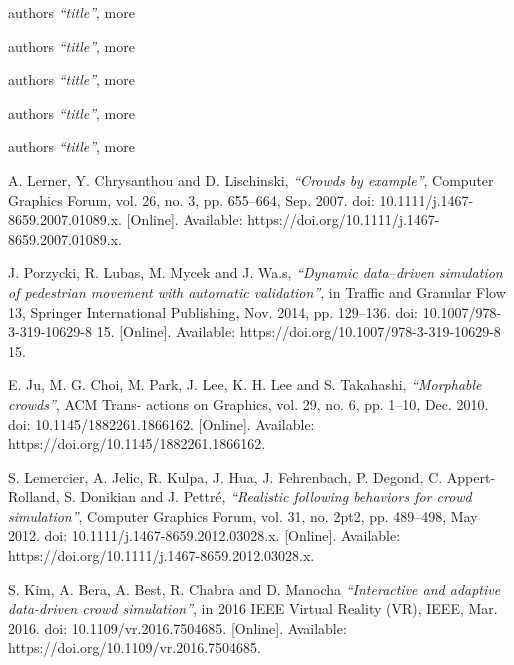 \documentclass{standalone}
\begin{document}
\begin{thebibliography}{99}
authors 
  \textit{“title”}, 
more


authors 
  \textit{“title”}, 
more


authors 
  \textit{“title”}, 
more

authors 
  \textit{“title”}, 
more


authors 
  \textit{“title”}, 
more














A. Lerner, Y. Chrysanthou and D. Lischinski, 
  \textit{“Crowds by example”}, 
  Computer Graphics Forum, vol. 26, no. 3, pp. 655–664, 
  Sep. 2007. 
  doi: 10.1111/j.1467-8659.2007.01089.x. 
  [Online]. Available: https://doi.org/10.1111/j.1467-8659.2007.01089.x.


J. Porzycki, R. Lubas, M. Mycek and J. Wa.s, 
  \textit{“Dynamic data–driven simulation of pedestrian movement with automatic validation”}, 
  in Traffic and Granular Flow 13, Springer International Publishing, 
  Nov. 2014, pp. 129–136. 
  doi: 10.1007/978-3-319-10629-8 15. 
  [Online]. Available: https://doi.org/10.1007/978-3-319-10629-8 15.


E. Ju, M. G. Choi, M. Park, J. Lee, K. H. Lee and S. Takahashi,
  \textit{“Morphable crowds”}, 
ACM Trans- actions on Graphics, vol. 29, no. 6, pp. 1–10, 
Dec. 2010. 
doi: 10.1145/1882261.1866162. 
[Online]. Available: https://doi.org/10.1145/1882261.1866162.


S. Lemercier, A. Jelic, R. Kulpa, J. Hua, J. Fehrenbach, P. Degond, C. Appert-Rolland, S. Donikian and J. Pettré,
  \textit{“Realistic following behaviors for crowd simulation”}, 
  Computer Graphics Forum, vol. 31, no. 2pt2, pp. 489–498, 
  May 2012. 
  doi: 10.1111/j.1467-8659.2012.03028.x. 
  [Online]. Available: https://doi.org/10.1111/j.1467-8659.2012.03028.x.

 
S. Kim, A. Bera, A. Best, R. Chabra and D. Manocha
  \textit{“Interactive and adaptive data-driven crowd simulation”}, 
  in 2016 IEEE Virtual Reality (VR), IEEE, 
  Mar. 2016. 
  doi: 10.1109/vr.2016.7504685. 
  [Online]. Available: https://doi.org/10.1109/vr.2016.7504685.
  


\end{thebibliography}
\end{document}
